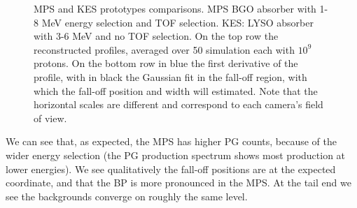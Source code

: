 \documentclass[a4paper,english,12pt]{article}
\begin{document}
\begin{figure}[!htp]
  \centering
  \quad
  \caption{\label{fig:PGprofileProtoComp}MPS and KES prototypes comparisons. MPS BGO absorber with 1-8 MeV energy selection and TOF selection. KES: LYSO absorber with 3-6 MeV and no TOF selection. On the top row the reconstructed profiles, averaged over 50 simulation each with $10^9$ protons. On the bottom row in blue the first derivative of the profile, with in black the Gaussian fit in the fall-off region, with which the fall-off position and width will estimated. Note that the horizontal scales are different and correspond to each camera's field of view.}
\end{figure}  

We can see that, as expected, the MPS has higher PG counts, because of the wider energy selection (the PG production spectrum shows most production at lower energies). We see qualitatively the fall-off positions are at the expected coordinate, and that the BP is more pronounced in the MPS. At the tail end we see the backgrounds converge on roughly the same level. 
\end{document}
